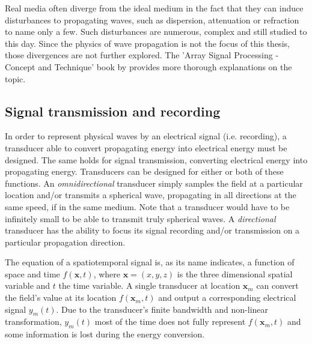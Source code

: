Real media often diverge from the ideal medium in the fact that they can induce disturbances to propagating waves, such as dispersion, attenuation or refraction to name only a few. Such disturbances are numerous, complex and still studied to this day. Since the physics of wave propagation is not the focus of this thesis, those divergences are not further explored. The 'Array Signal Processing - Concept and Technique' book by \cite{Dudgeon_book} provides more thorough explanations on the topic.


\subsection{Signal transmission and recording}
\label{sec:sensor_arrays}
In order to represent physical waves by an electrical signal (i.e. recording), a transducer able to convert propagating energy into electrical energy must be designed. The same holds for signal transmission, converting electrical energy into propagating energy.
Transducers can be designed for either or both of these functions.
An \textit{omnidirectional} transducer simply samples the field at a particular location and/or transmits a spherical wave, propagating in all directions at the same speed, if in the same medium. Note that a transducer would have to be infinitely small to be able to transmit truly spherical waves. A \textit{directional} transducer has the ability to focus its signal recording and/or transmission on a particular propagation direction.

The equation of a spatiotemporal signal is, as its name indicates, a function of space and time $f(\boldsymbol{x}, t)$, where $\boldsymbol{x} = (x, y, z)$ is the three dimensional spatial variable and $t$ the time variable. A single transducer at location $\boldsymbol{x}_m$ can convert the field's value at its location $f(\boldsymbol{x}_m, t)$ and output a corresponding electrical signal $y_m(t)$. Due to the transducer's finite bandwidth and non-linear transformation, $y_m(t)$ most of the time does not fully represent $f(\boldsymbol{x}_m, t)$ and some information is lost during the energy conversion.

